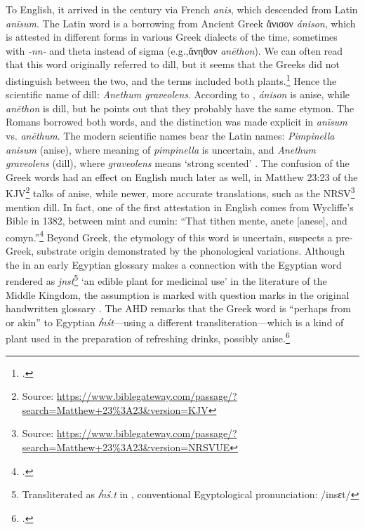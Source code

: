 To English, it arrived in the  century via French \textit{anis}, which descended from Latin \textit{anīsum}. The Latin word is a borrowing from Ancient Greek ἄνισον \textit{ánison}, which is attested in different forms in various Greek dialects of the time, sometimes with \textit{-nn-} and theta instead of sigma (e.g.,ἄνηθον \textit{anēthon}). We can often read that this word originally referred to dill, but it seems that the Greeks did not distinguish between the two, and the terms included both plants.\footcite[anise]{oed} Hence the scientific name of dill: \textit{Anethum graveolens}. According to \textcite[103,107]{beekes_etymological_2010}, \textit{ánison} is anise, while \textit{anēthon} is dill, but he points out that they probably have the same etymon. The Romans borrowed both words, and the distinction was made explicit in \textit{anīsum} vs. \textit{anēthum}. The modern scientific names bear the Latin names: \textit{Pimpinella anisum} (anise), where meaning of \textit{pimpinella} is uncertain, and \textit{Anethum graveolens} (dill), where \textit{graveolens} means `strong scented' \autocite[184,303]{gledhill_names_2008}. The confusion of the Greek words had an effect on English much later as well, in Matthew 23:23 of the \gls{KJV}\footnote{Source: \url{https://www.biblegateway.com/passage/?search=Matthew+23\%3A23&version=KJV}} talks of anise, while newer, more accurate translations, such as the \gls{NRSV}\footnote{Source: \url{https://www.biblegateway.com/passage/?search=Matthew+23\%3A23&version=NRSVUE}} mention dill. In fact, one of the first attestation in English comes from Wycliffe's Bible in 1382, between mint and cumin: ``That tithen mente, anete [anese], and comyn.''\footcite[anise]{oed} Beyond Greek, the etymology of this word is uncertain, \textcite[103,107]{beekes_etymological_2010} suspects a pre-Greek, substrate origin demonstrated by the phonological variations. Although the  in an early Egyptian glossary makes a connection with the Egyptian word rendered as \textit{jnst}\footnote{Transliterated as \textit{ꞽnś.t} in \textcite[99]{erman_worterbuch_1926}, conventional Egyptological pronunciation: /insɛt/} `an edible plant for medicinal use' in the literature of the Middle Kingdom, the assumption is marked with question marks in the original handwritten glossary \autocites[240]{hemmerdinger_noms_1968}[99]{erman_worterbuch_1926}. The \gls{AHD} remarks that the Greek word is ``perhaps from or akin'' to Egyptian \textit{ꞽnśt}---using a different transliteration---which is a kind of plant used in the preparation of refreshing drinks, possibly anise.\footcite[anise ]{ahd} 

